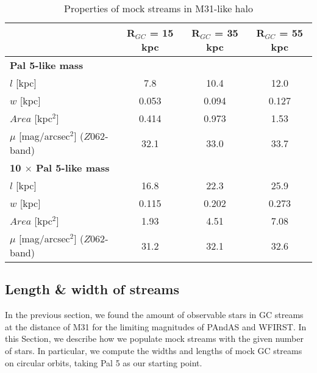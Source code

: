 \documentclass[twocolumn]{aastex62}
\begin{document}
\begin{table*}
\centering
\caption{Properties of mock streams in M31-like halo}
\label{tab:Pal5}
\begin{tabular}{lccc}
\hline
 & {\bf R$_{GC}$ = 15 kpc }&  {\bf R$_{GC}$ = 35 kpc} &  {\bf R$_{GC}$ = 55 kpc} \\ 
 \hline
{\bf Pal 5-like mass} & &&\\
$l$ [kpc] & 7.8 & 10.4 &  12.0  \\
$w$ [kpc] & 0.053 & 0.094  & 0.127  \\
$Area$ [kpc$^2$] & 0.414 & 0.973 &1.53 \\
$\mu$ [mag/arcsec$^2$] ($Z062$-band) &32.1 &33.0  &33.7  \\
\hline
{\bf 10 $\times$ Pal 5-like mass} & &&\\ 
$l$ [kpc] &16.8 & 22.3 & 25.9 \\
$w$ [kpc]& 0.115 & 0.202 & 0.273  \\
$Area$ [kpc$^2$] &  1.93& 4.51   & 7.08  \\
$\mu$ [mag/arcsec$^2$] ($Z062$-band) &31.2 &32.1  &32.6  \\

\hline 
\end{tabular}
\end{table*}



\subsection{Length \& width of streams}
\label{sec:length}
In the previous section, we found the amount of observable stars in GC streams at the distance of M31 for the limiting magnitudes of PAndAS and WFIRST. In this Section, we describe how we populate mock streams with the given number of stars. In particular, we compute the widths and lengths of mock GC streams on circular orbits, taking Pal 5 as our starting point. 
\end{document}
